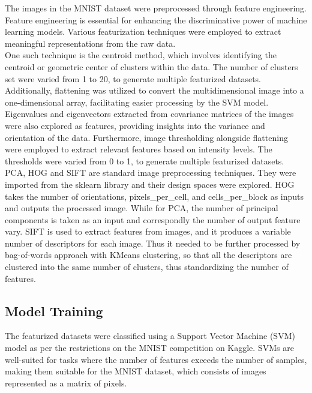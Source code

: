 \documentclass{article}
\begin{document}
The images in the MNIST dataset were preprocessed through feature engineering. Feature engineering is essential for enhancing the discriminative power of machine learning models. Various featurization techniques were employed to extract meaningful representations from the raw data. 
\\
One such technique is the centroid method, which involves identifying the centroid or geometric center of clusters within the data. The number of clusters set were varied from 1 to 20, to generate multiple featurized datasets. Additionally, flattening was utilized to convert the multidimensional image into a one-dimensional array, facilitating easier processing by the SVM model. 
\\
Eigenvalues and eigenvectors extracted from covariance matrices of the images were also explored as features, providing insights into the variance and orientation of the data. 
Furthermore, image thresholding alongside flattening were employed to extract relevant features based on intensity levels. The thresholds were varied from 0 to 1, to generate multiple featurized datasets.
\\ 
PCA, HOG and SIFT are standard image preprocessing techniques. They were imported from the sklearn library and their design spaces were explored. HOG takes the number of orientations, pixels\_per\_cell, and cells\_per\_block as inputs and outputs the processed image. While for PCA, the number of principal components is taken as an input and correspondly the number of output feature vary. SIFT is used to extract features from images, and it produces a variable number of descriptors for each image. Thus it needed to be further processed by bag-of-words approach with KMeans clustering, so that all the descriptors are clustered into the same number of clusters, thus standardizing the number of features.

\subsection{Model Training}
The featurized datasets were classified using a Support Vector Machine (SVM) model as per the restrictions on the MNIST competition on Kaggle. SVMs are well-suited for tasks where the number of features exceeds the number of samples, making them suitable for the MNIST dataset, which consists of images represented as a matrix of pixels.
\end{document}
